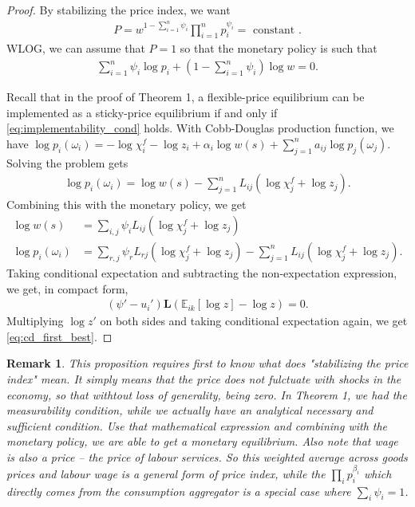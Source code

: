 \documentclass[12pt]{article}
\newtheorem*{remark}{Remark}
\numberwithin{equation}{section}
\begin{document}
\begin{proof}
    By stabilizing the price index, we want
    \begin{align*}
        P = w^{1-\sum_{i=1}^n \psi_i} \prod_{i=1}^n p_i^{\psi_i} = \text{ constant }.
    \end{align*}
    WLOG, we can assume that $P=1$ so that the monetary policy is such that
    \begin{align*}
        \sum_{i=1}^n \psi_i \log p_i + (1-\sum_{i=1}^n \psi_i) \log w = 0.
    \end{align*}

    Recall that in the proof of Theorem 1, a flexible-price equilibrium can be implemented as a sticky-price equilibrium if and only if \eqref{eq:implementability_cond} holds. With Cobb-Douglas production function, we have $\log p_{i}(\omega_{i}) = -\log \chi^f_i - \log z_i + \alpha_i \log w(s) + \sum_{j=1}^n a_{ij} \log p_j(\omega_j)$. Solving the problem gets
    \begin{align*}
        \log p_i(\omega_i) = \log w(s) - \sum_{j=1}^n L_{ij}(\log \chi^f_j + \log z_j).
    \end{align*}
    Combining this with the monetary policy, we get
    \begin{align*}
        \log w(s) &= \sum_{i,j}\psi_i L_{ij}(\log \chi^f_j + \log z_j)\\
        \log p_i(\omega_i) &= \sum_{r,j}\psi_r L_{rj}(\log \chi^f_j + \log z_j) - \sum_{j=1}^n L_{ij}(\log \chi^f_j + \log z_j).
    \end{align*}
    Taking conditional expectation and subtracting the non-expectation expression, we get, in compact form,
    \begin{align*}
        (\psi' - u_i') \mathbf{L} \left(\mathbb{E}_{ik}[\log z] - \log z\right)=0.
    \end{align*}
    Multiplying $\log z'$ on both sides and taking conditional expectation again, we get \eqref{eq:cd_first_best}.
\end{proof}

\begin{remark}
    This proposition requires first to know what does "stabilizing the price index" mean. It simply means that the price does not fulctuate with shocks in the economy, so that withtout loss of generality, being zero. In Theorem 1, we had the measurability condition, while we actually have an analytical necessary and sufficient condition. Use that mathematical expression and combining with the monetary policy, we are able to get a monetary equilibrium. Also note that wage is also a price -- the price of labour services. So this weighted average across goods prices and labour wage is a general form of price index, while the $\prod_{i} p_i^{\beta_i}$ which directly comes from the consumption aggregator is a special case where $\sum_i \psi_i = 1$.
\end{remark}
\end{document}
